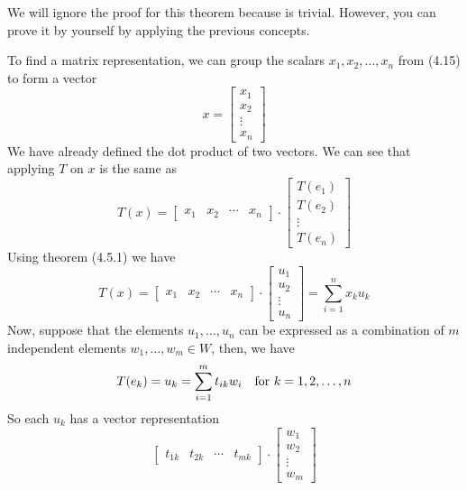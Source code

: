 \documentclass[../linear-spaces.tex]{subfiles}
\begin{document}
We will ignore the proof for this theorem because is trivial. However, you can
prove it by yourself by applying the previous concepts.

To find a matrix representation, we can group the scalars $x_1, x_2,\dots,x_n$
from (4.15) to form a vector
\begin{equation}
    x = \left[
        \begin{matrix}
            x_1 \\ x_2 \\ \vdots \\ x_n
        \end{matrix}
        \right]
\end{equation}
We have already defined the dot product of two vectors. We can see that applying $T$ on $x$ is the same as
\begin{equation}
    T(x) = \left[
        \begin{matrix}
            x_1 & x_2 & \cdots & x_n
        \end{matrix}
        \right]\cdot  \left[
        \begin{matrix}
            T(e_1) \\ T(e_2) \\ \vdots \\ T(e_n)
        \end{matrix}
        \right]
\end{equation}
Using theorem (4.5.1) we have
\begin{equation}
    T(x) = \left[
        \begin{matrix}
            x_1 & x_2 & \cdots & x_n
        \end{matrix}
        \right]\cdot  \left[
        \begin{matrix}
            u_1 \\ u_2 \\ \vdots \\ u_n
        \end{matrix}
        \right] = \sum_{i=1}^{n}{x_k u_k}
\end{equation}
Now, suppose that the elements $u_1,\dots,u_n$ can be expressed as a combination of $m$ independent elements $w_1,\dots,w_m\in W$,
then, we have
\begin{equation}
    T(e_k) = u_k = \sum_{i=1}^{m}{t_{ik}w_i}\quad \textnormal{for }k=1,2,\dots,n
\end{equation}
So each $u_k$ has a vector representation
\begin{equation*}
    \left[
        \begin{matrix}
            t_{1k} & t_{2k} & \cdots & t_{mk}
        \end{matrix}
        \right]\cdot  \left[
        \begin{matrix}
            w_1 \\ w_2 \\ \vdots \\ w_m
        \end{matrix}
        \right]
\end{equation*}
\end{document}

